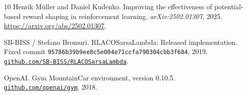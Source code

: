 \documentclass[10pt,twocolumn,letterpaper]{article}
\begin{document}
\begin{thebibliography}{10}
Henrik M\"uller and Daniel Kudenko.
Improving the effectiveness of potential-based reward shaping in reinforcement learning.
\emph{arXiv:2502.01307}, 2025.
\url{https://arxiv.org/abs/2502.01307}.

SB-BISS / Stefano Bromuri.
RLACOSarsaLambda: Released implementation.
Fixed commit \texttt{95786b39b9ee8c5e004e71ccfa790304cbb3f684}, 2019.
\href{https://github.com/SB-BISS/RLACOSarsaLambda/tree/95786b39b9ee8c5e004e71ccfa790304cbb3f684}{\texttt{github.com/SB-BISS/RLACOSarsaLambda}}.

OpenAI.
Gym MountainCar environment, version 0.10.5.
\href{https://github.com/openai/gym/blob/v0.10.5/gym/envs/classic_control/mountain_car.py}{\texttt{github.com/openai/gym}}, 2018.
\end{thebibliography}
\end{document}
